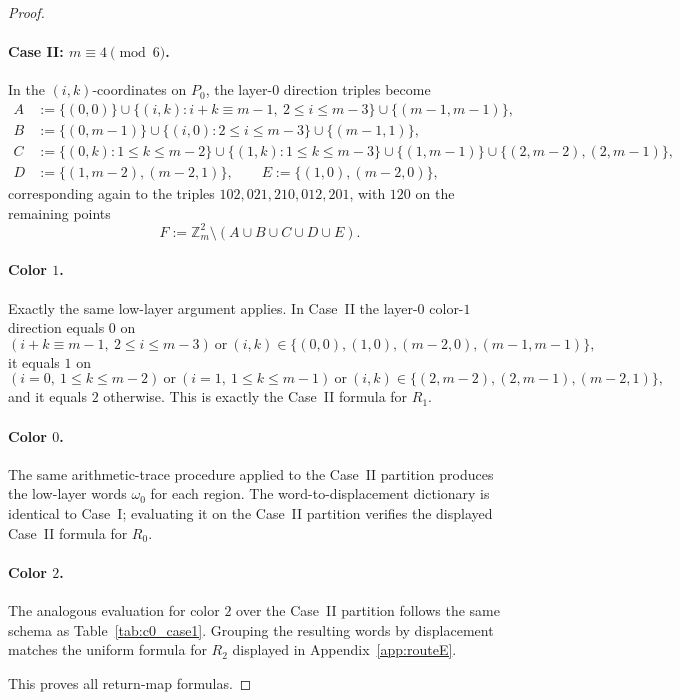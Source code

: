 \documentclass[11pt]{article}
\begin{document}
\begin{proof}
\paragraph{Case II: $m\equiv 4\pmod 6$.}
In the $(i,k)$-coordinates on $P_0$, the layer-$0$ direction triples become
\begin{align*}
A&:=\{(0,0)\}\cup\{(i,k):i+k\equiv m-1,\ 2\le i\le m-3\}\cup\{(m-1,m-1)\},\\
B&:=\{(0,m-1)\}\cup\{(i,0):2\le i\le m-3\}\cup\{(m-1,1)\},\\
C&:=\{(0,k):1\le k\le m-2\}\cup\{(1,k):1\le k\le m-3\}\cup\{(1,m-1)\}\cup\{(2,m-2),(2,m-1)\},\\
D&:=\{(1,m-2),(m-2,1)\},\qquad E:=\{(1,0),(m-2,0)\},
\end{align*}
corresponding again to the triples $102,021,210,012,201$, with $120$ on the remaining points
\[
F:=\mathbb Z_m^2\setminus (A\cup B\cup C\cup D\cup E).
\]

\paragraph{Color $1$.}
Exactly the same low-layer argument applies.
In Case~II the layer-$0$ color-$1$ direction equals $0$ on
\[
(i+k\equiv m-1,\ 2\le i\le m-3)\ \text{or}\ (i,k)\in\{(0,0),(1,0),(m-2,0),(m-1,m-1)\},
\]
it equals $1$ on
\[
(i=0,\ 1\le k\le m-2)\ \text{or}\ (i=1,\ 1\le k\le m-1)\ \text{or}\ (i,k)\in\{(2,m-2),(2,m-1),(m-2,1)\},
\]
and it equals $2$ otherwise.
This is exactly the Case~II formula for $R_1$.

\paragraph{Color $0$.}
The same arithmetic-trace procedure applied to the Case~II partition produces the low-layer words $\omega_0$ for each region.
The word-to-displacement dictionary is identical to Case~I; evaluating it on the Case~II partition verifies the displayed Case~II formula for $R_0$.

\paragraph{Color $2$.}
The analogous evaluation for color $2$ over the Case~II partition follows the same schema as Table~\ref{tab:c0_case1}.
Grouping the resulting words by displacement matches the uniform formula for $R_2$ displayed in Appendix~\ref{app:routeE}.

This proves all return-map formulas.
\end{proof}
\end{document}
